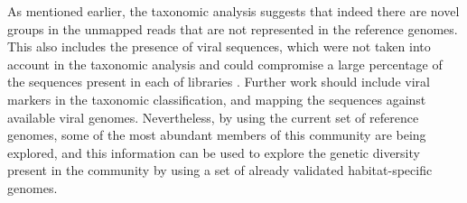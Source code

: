 As mentioned earlier, the taxonomic analysis suggests that indeed there are novel groups in the unmapped reads that are not represented in the reference genomes. This also includes the presence of viral sequences, which were not taken into account in the taxonomic analysis and could compromise a large percentage of the sequences present in each of libraries \cite{RodriguezBrito:2010in,Emerson:tk}. Further work should include viral markers in the taxonomic classification, and mapping the sequences against available viral genomes. Nevertheless, by using the current set of reference genomes, some of the most abundant members of this community are being explored, and this information can be used to explore the genetic diversity present in the community by using a set of already validated habitat-specific genomes.

